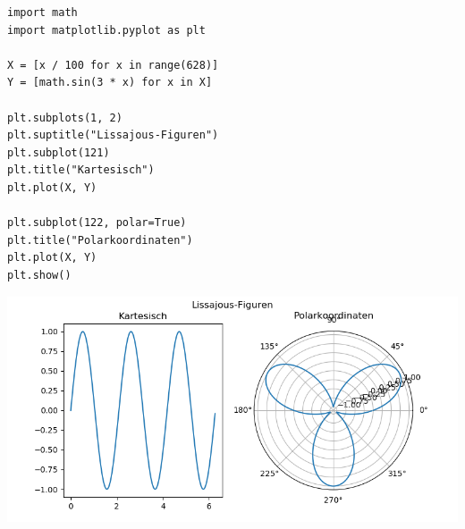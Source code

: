 \begin{frame}[fragile]
%
\begin{codebox}
\begin{verbatim}
import math
import matplotlib.pyplot as plt

X = [x / 100 for x in range(628)]
Y = [math.sin(3 * x) for x in X]

plt.subplots(1, 2)
plt.suptitle("Lissajous-Figuren")
plt.subplot(121)
plt.title("Kartesisch")
plt.plot(X, Y)

plt.subplot(122, polar=True)
plt.title("Polarkoordinaten")
plt.plot(X, Y)
plt.show()
\end{verbatim}
\end{codebox}
%
\end{frame}


\begin{frame}[fragile]
%
\begin{tcolorbox}[title=Lissajous-Figures]
\begin{center}
	\includegraphics[width=\linewidth]{./gfx/plt-Lissajous}
\end{center}
\end{tcolorbox}
%
\end{frame}


